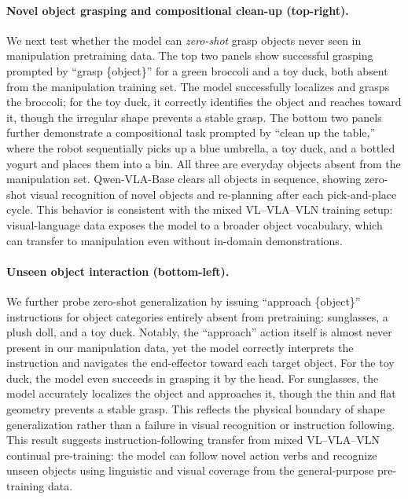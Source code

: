 \documentclass{llmxive}
\begin{document}
\paragraph{Novel object grasping and compositional clean-up (top-right).}
We next test whether the model can \emph{zero-shot} grasp objects never seen in manipulation pretraining data.
The top two panels show successful grasping prompted by ``grasp \{object\}'' for a green broccoli and a toy duck, both absent from the manipulation training set.
The model successfully localizes and grasps the broccoli; for the toy duck, it correctly identifies the object and reaches toward it, though the irregular shape prevents a stable grasp.
The bottom two panels further demonstrate a compositional task prompted by ``clean up the table,'' where the robot sequentially picks up a blue umbrella, a toy duck, and a bottled yogurt and places them into a bin. All three are everyday objects absent from the manipulation set.
Qwen-VLA-Base clears all objects in sequence, showing zero-shot visual recognition of novel objects and re-planning after each pick-and-place cycle.
This behavior is consistent with the mixed VL--VLA--VLN training setup: visual-language data exposes the model to a broader object vocabulary, which can transfer to manipulation even without in-domain demonstrations.

\paragraph{Unseen object interaction (bottom-left).}
We further probe zero-shot generalization by issuing ``approach \{object\}'' instructions for object categories entirely absent from pretraining: sunglasses, a plush doll, and a toy duck.
Notably, the ``approach'' action itself is almost never present in our manipulation data, yet the model correctly interprets the instruction and navigates the end-effector toward each target object.
For the toy duck, the model even succeeds in grasping it by the head.
For sunglasses, the model accurately localizes the object and approaches it, though the thin and flat geometry prevents a stable grasp. This reflects the physical boundary of shape generalization rather than a failure in visual recognition or instruction following.
This result suggests instruction-following transfer from mixed VL--VLA--VLN continual pre-training: the model can follow novel action verbs and recognize unseen objects using linguistic and visual coverage from the general-purpose pre-training data.
\end{document}
